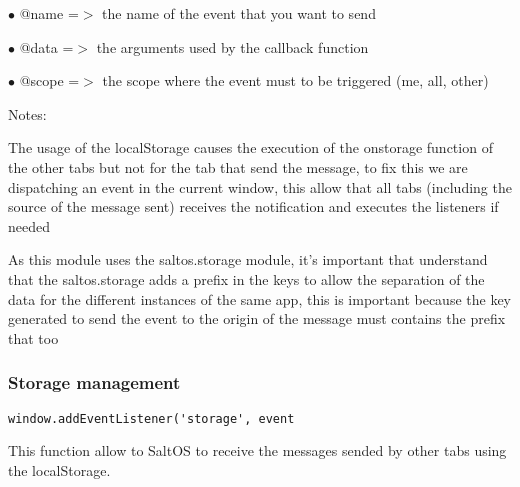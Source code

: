 \documentclass[a4paper]{article}
\begin{document}
\begin{compactitem}
\item[\color{myblue}$\bullet$] @name  =$>$ the name of the event that you want to send
\item[\color{myblue}$\bullet$] @data  =$>$ the arguments used by the callback function
\item[\color{myblue}$\bullet$] @scope =$>$ the scope where the event must to be triggered (me, all, other)
\end{compactitem}

Notes:

The usage of the localStorage causes the execution of the onstorage function
of the other tabs but not for the tab that send the message, to fix this we
are dispatching an event in the current window, this allow that all tabs
(including the source of the message sent) receives the notification and
executes the listeners if needed

As this module uses the saltos.storage module, it's important that understand
that the saltos.storage adds a prefix in the keys to allow the separation of
the data for the different instances of the same app, this is important because
the key generated to send the event to the origin of the message must contains
the prefix that too

\hypertarget{toc869}{}
\subsubsection{Storage management}

\begin{lstlisting}
window.addEventListener('storage', event
\end{lstlisting}

This function allow to SaltOS to receive the messages sended by other tabs
using the localStorage.

\end{document}
